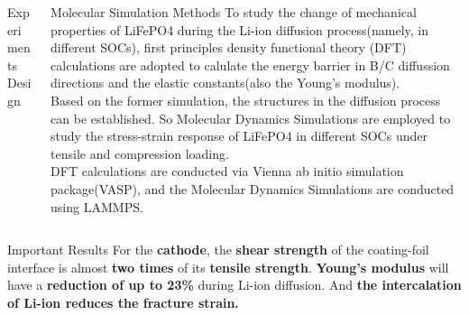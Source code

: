 \documentclass[final]{beamer}
\newlength{\onecolwid}
\newlength{\twocolwid}
\begin{document}
\begin{frame}[t]
\begin{columns}[t]
\begin{column}{\twocolwid}
\begin{columns}[t,totalwidth=\twocolwid]
\begin{column}{\onecolwid}
\begin{block}{Experiments Design}
\end{block}


\end{column} %

\begin{column}{\onecolwid}\vspace{-.6in} %


\begin{block}{Molecular Simulation Methods}
To study the change of mechanical properties of LiFePO4 during the Li-ion diffusion process(namely, in different SOCs), first principles density functional theory (DFT) calculations are adopted to calulate the energy barrier in B/C diffussion directions and the elastic constants(also the Young's modulus). \\
Based on the former simulation, the structures in the diffusion process can be established. So Molecular Dynamics Simulations are employed to study the stress-strain response of LiFePO4 in different SOCs under tensile and compression loading.\\
DFT calculations are conducted via Vienna ab initio simulation package\cite{Kresse1996Efficient}(VASP), and the Molecular Dynamics Simulations are conducted using LAMMPS\cite{Plimpton1995Fast}.
\end{block}


\end{column} %

\end{columns} %

\begin{alertblock}{Important Results}
For the \textbf{cathode}, the \textbf{shear strength} of
the coating-foil interface is almost \textbf{two times} of its \textbf{tensile
strength}. 
\textbf{Young's modulus} will have a \textbf{reduction of up to 23\%} during Li-ion diffusion. And \textbf{the intercalation of Li-ion reduces the fracture strain.}
\end{alertblock} 


\end{column}
\end{columns}
\end{frame}
\end{document}
